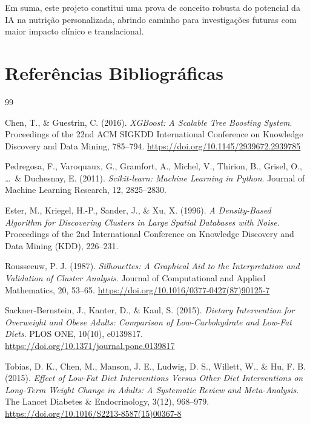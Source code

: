 Em suma, este projeto constitui uma prova de conceito robusta do potencial da IA na nutrição personalizada, abrindo caminho para investigações futuras com maior impacto clínico e translacional.


\section*{Refer\^encias Bibliogr\'aficas}

\begin{thebibliography}{99}

Chen, T., \& Guestrin, C. (2016).
\textit{XGBoost: A Scalable Tree Boosting System}.
Proceedings of the 22nd ACM SIGKDD International Conference on Knowledge Discovery and Data Mining, 785--794.
\url{https://doi.org/10.1145/2939672.2939785}

Pedregosa, F., Varoquaux, G., Gramfort, A., Michel, V., Thirion, B., Grisel, O., \ldots\ \& Duchesnay, E. (2011).
\textit{Scikit-learn: Machine Learning in Python}.
Journal of Machine Learning Research, 12, 2825--2830.

Ester, M., Kriegel, H.-P., Sander, J., \& Xu, X. (1996).
\textit{A Density-Based Algorithm for Discovering Clusters in Large Spatial Databases with Noise}.
Proceedings of the 2nd International Conference on Knowledge Discovery and Data Mining (KDD), 226--231.

Rousseeuw, P. J. (1987).
\textit{Silhouettes: A Graphical Aid to the Interpretation and Validation of Cluster Analysis}.
Journal of Computational and Applied Mathematics, 20, 53--65.
\url{https://doi.org/10.1016/0377-0427(87)90125-7}

Sackner-Bernstein, J., Kanter, D., \& Kaul, S. (2015).
\textit{Dietary Intervention for Overweight and Obese Adults: Comparison of Low-Carbohydrate and Low-Fat Diets}.
PLOS ONE, 10(10), e0139817.
\url{https://doi.org/10.1371/journal.pone.0139817}

Tobias, D. K., Chen, M., Manson, J. E., Ludwig, D. S., Willett, W., \& Hu, F. B. (2015).
\textit{Effect of Low-Fat Diet Interventions Versus Other Diet Interventions on Long-Term Weight Change in Adults: A Systematic Review and Meta-Analysis}.
The Lancet Diabetes \& Endocrinology, 3(12), 968--979.
\url{https://doi.org/10.1016/S2213-8587(15)00367-8}


\end{thebibliography}
